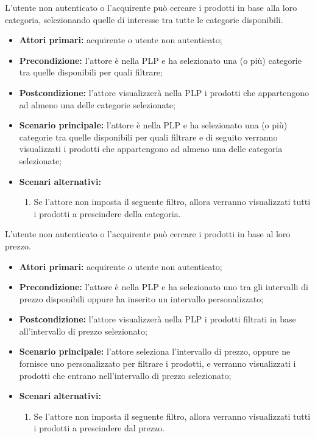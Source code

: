 \label{filtro-prodotti-acquirente.categoria}

L'utente non autenticato o l'acquirente può cercare i prodotti in base alla loro categoria, selezionando quelle di interesse tra tutte le categorie disponibili.
\begin{itemize}
    \item \textbf{Attori primari:} acquirente o utente non autenticato;
    \item \textbf{Precondizione:} l'attore è nella PLP e ha selezionato una (o più) categorie tra quelle disponibili per quali filtrare;
    \item \textbf{Postcondizione:} l'attore visualizzerà nella PLP i prodotti che appartengono ad almeno una delle categorie selezionate;
    \item \textbf{Scenario principale:} l'attore è nella PLP e ha selezionato una (o più) categorie tra quelle disponibili per quali filtrare e di seguito verranno visualizzati i prodotti che appartengono ad almeno una delle categoria selezionate;
    \item \textbf{Scenari alternativi:}
    \begin{enumerate}[label=\lett]
        \item Se l'attore non imposta il seguente filtro, allora verranno visualizzati tutti i prodotti a prescindere della categoria.
    \end{enumerate}
\end{itemize}

\label{filtro-prodotti-acquirente.prezzo}

L'utente non autenticato o l'acquirente può cercare i prodotti in base al loro prezzo.
\begin{itemize}
    \item \textbf{Attori primari:} acquirente o utente non autenticato;
    \item \textbf{Precondizione:} l'attore è nella PLP e ha selezionato uno tra gli intervalli di prezzo disponibili oppure ha inserito un intervallo personalizzato;
    \item \textbf{Postcondizione:} l'attore visualizzerà nella PLP i prodotti filtrati in base all'intervallo di prezzo selezionato;
    \item \textbf{Scenario principale:} l'attore seleziona l'intervallo di prezzo, oppure ne fornisce uno personalizzato per filtrare i prodotti, e verranno visualizzati i prodotti che entrano nell'intervallo di prezzo selezionato;
    \item \textbf{Scenari alternativi:}
    \begin{enumerate}[label=\lett]
        \item Se l'attore non imposta il seguente filtro, allora verranno visualizzati tutti i prodotti a prescindere dal prezzo.
    \end{enumerate}
\end{itemize}

